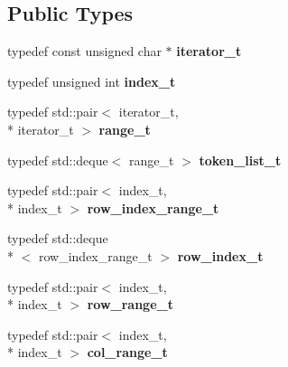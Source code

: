 \subsection*{Public Types}
\begin{DoxyCompactItemize}
\item 
\hypertarget{classstrtk_1_1token__grid_a3ea861ca892a621240f913d1509bb04f}{typedef const unsigned char $\ast$ {\bfseries iterator\-\_\-t}}\label{classstrtk_1_1token__grid_a3ea861ca892a621240f913d1509bb04f}

\item 
\hypertarget{classstrtk_1_1token__grid_a869b0c87afab4b1ed95232305e48cabd}{typedef unsigned int {\bfseries index\-\_\-t}}\label{classstrtk_1_1token__grid_a869b0c87afab4b1ed95232305e48cabd}

\item 
\hypertarget{classstrtk_1_1token__grid_a4538cc2894f2270234e09441dcb2a2f3}{typedef std\-::pair$<$ iterator\-\_\-t, \\*
iterator\-\_\-t $>$ {\bfseries range\-\_\-t}}\label{classstrtk_1_1token__grid_a4538cc2894f2270234e09441dcb2a2f3}

\item 
\hypertarget{classstrtk_1_1token__grid_ad4d3c0e3c6f86f28d2392959d3d0b04d}{typedef std\-::deque$<$ range\-\_\-t $>$ {\bfseries token\-\_\-list\-\_\-t}}\label{classstrtk_1_1token__grid_ad4d3c0e3c6f86f28d2392959d3d0b04d}

\item 
\hypertarget{classstrtk_1_1token__grid_a67ca1a24eebed9a64b15c03848830c67}{typedef std\-::pair$<$ index\-\_\-t, \\*
index\-\_\-t $>$ {\bfseries row\-\_\-index\-\_\-range\-\_\-t}}\label{classstrtk_1_1token__grid_a67ca1a24eebed9a64b15c03848830c67}

\item 
\hypertarget{classstrtk_1_1token__grid_ace491e5f0e24b2b9decfcd2e9053816e}{typedef std\-::deque\\*
$<$ row\-\_\-index\-\_\-range\-\_\-t $>$ {\bfseries row\-\_\-index\-\_\-t}}\label{classstrtk_1_1token__grid_ace491e5f0e24b2b9decfcd2e9053816e}

\item 
\hypertarget{classstrtk_1_1token__grid_a30f043a193c65c86329cc2c998998f32}{typedef std\-::pair$<$ index\-\_\-t, \\*
index\-\_\-t $>$ {\bfseries row\-\_\-range\-\_\-t}}\label{classstrtk_1_1token__grid_a30f043a193c65c86329cc2c998998f32}

\item 
\hypertarget{classstrtk_1_1token__grid_a2664e5f5dc5259ccd6d0347abb2b5037}{typedef std\-::pair$<$ index\-\_\-t, \\*
index\-\_\-t $>$ {\bfseries col\-\_\-range\-\_\-t}}\label{classstrtk_1_1token__grid_a2664e5f5dc5259ccd6d0347abb2b5037}

\end{DoxyCompactItemize}
